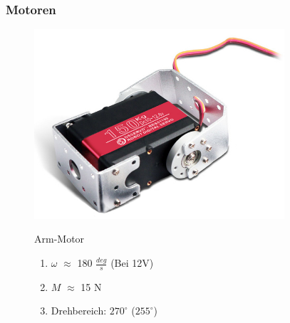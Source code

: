 \documentclass[aspectratio=169]{beamer}
\begin{document}
\begin{frame}
	\frametitle{Motoren}
	\begin{figure}[h]
		\begin{minipage}[c]{.46\linewidth}
			\centering
			\includegraphics[height = 200pt]{../resources/UpperServo.jpg}
		\end{minipage}
		\hfill%
		\begin{minipage}[c]{.46\linewidth}
			\begin{block}{Arm-Motor}
				\begin{enumerate}
					\item $\omega$ $\approx$ 180 $\frac{deg}{s}$ (Bei 12$\si{\volt}$)
					\item $M$ $\approx$ 15 $\si{\newton}$
					\item Drehbereich: $270^\circ$ ($255^\circ$)
				\end{enumerate}
			\end{block}
		\end{minipage}
	\end{figure}
\end{frame}



\end{document}
